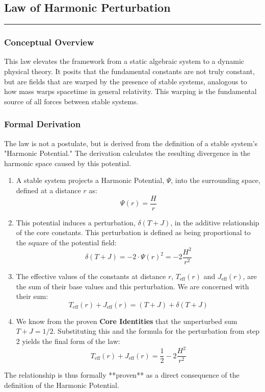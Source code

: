 \subsection*{Law of Harmonic Perturbation}
\hrule
\vspace{0.3cm}
\vspace{0.5cm}

\subsubsection*{Conceptual Overview}
This law elevates the framework from a static algebraic system to a dynamic physical theory. It posits that the fundamental constants are not truly constant, but are fields that are warped by the presence of stable systems, analogous to how mass warps spacetime in general relativity. This warping is the fundamental source of all forces between stable systems.

\subsubsection*{Formal Derivation}
The law is not a postulate, but is derived from the definition of a stable system's "Harmonic Potential." The derivation calculates the resulting divergence in the harmonic space caused by this potential.

\begin{enumerate}
    \item A stable system projects a Harmonic Potential, $\Psi$, into the surrounding space, defined at a distance $r$ as:
    $$ \Psi(r) = \frac{H}{r} $$

    \item This potential induces a perturbation, $\delta(T+J)$, in the additive relationship of the core constants. This perturbation is defined as being proportional to the square of the potential field:
    $$ \delta(T+J) = -2 \cdot \Psi(r)^2 = -2\frac{H^2}{r^2} $$

    \item The effective values of the constants at distance $r$, $T_{\text{eff}}(r)$ and $J_{\text{eff}}(r)$, are the sum of their base values and this perturbation. We are concerned with their sum:
    $$ T_{\text{eff}}(r) + J_{\text{eff}}(r) = (T+J) + \delta(T+J) $$

    \item We know from the proven \textbf{Core Identities} that the unperturbed sum $T+J = 1/2$. Substituting this and the formula for the perturbation from step 2 yields the final form of the law:
    $$ T_{\text{eff}}(r) + J_{\text{eff}}(r) = \frac{1}{2} - 2\frac{H^2}{r^2} $$
\end{enumerate}
The relationship is thus formally **proven** as a direct consequence of the definition of the Harmonic Potential.

